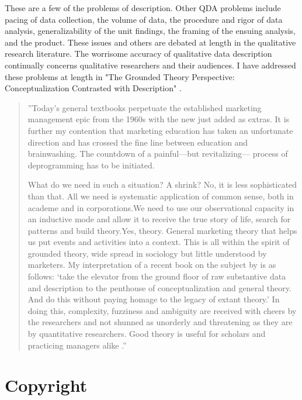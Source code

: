 These are a few of the problems of description. Other QDA problems include
pacing of data collection, the volume of data, the procedure and rigor of data
analysis, generalizability of the unit findings, the framing of the ensuing analysis, and the product. These issues and others are debated at length in the
qualitative research literature. The worrisome accuracy of qualitative data description
continually concerns qualitative researchers and their audiences. I have
addressed these problems at length in "The Grounded Theory Perspective:
Conceptualization Contrasted with Description"
\citep{book.glaser01}.







\begin{quote}
''Today’s general textbooks perpetuate the established marketing
management epic from the 1960s with the new just added as extras. It
is further my contention that marketing education has taken an
unfortunate direction and has crossed the fine line between education
and brainwashing. The countdown of a painful—but revitalizing—
process of deprogramming has to be initiated.

What do we need in such a situation? A shrink? No, it is less
sophisticated than that. All we need is systematic application of
common sense, both in academe and in corporations.We need to use
our observational capacity in an inductive mode and allow it to receive
the true story of life, search for patterns and build theory.Yes, theory.
General marketing theory that helps us put events and activities into a
context. This is all within the spirit of grounded theory, wide spread in
sociology but little understood by marketers. My interpretation of a
recent book on the subject by 
\citep{book.glaser01}
is as follows: ‘take the
elevator from the ground floor of raw substantive data and description to
the penthouse of conceptualization and general theory. And do this
without paying homage to the legacy of extant theory.’ In doing this,
complexity, fuzziness and ambiguity are received with cheers by the
researchers and not shunned as unorderly and threatening as they are
by quantitative researchers. Good theory is useful for scholars and
practicing managers alike \citep[p. 132]{article.gummensson02}.''
\end{quote}

\section*{Copyright}

